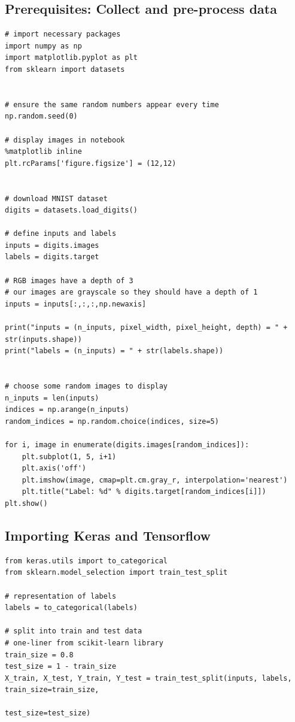 \documentclass[%
oneside,                 %
final,                   %
10pt]{article}
\begin{document}
\subsection*{Prerequisites: Collect and pre-process data}
\begin{verbatim}
# import necessary packages
import numpy as np
import matplotlib.pyplot as plt
from sklearn import datasets


# ensure the same random numbers appear every time
np.random.seed(0)

# display images in notebook
%matplotlib inline
plt.rcParams['figure.figsize'] = (12,12)


# download MNIST dataset
digits = datasets.load_digits()

# define inputs and labels
inputs = digits.images
labels = digits.target

# RGB images have a depth of 3
# our images are grayscale so they should have a depth of 1
inputs = inputs[:,:,:,np.newaxis]

print("inputs = (n_inputs, pixel_width, pixel_height, depth) = " + str(inputs.shape))
print("labels = (n_inputs) = " + str(labels.shape))


# choose some random images to display
n_inputs = len(inputs)
indices = np.arange(n_inputs)
random_indices = np.random.choice(indices, size=5)

for i, image in enumerate(digits.images[random_indices]):
    plt.subplot(1, 5, i+1)
    plt.axis('off')
    plt.imshow(image, cmap=plt.cm.gray_r, interpolation='nearest')
    plt.title("Label: %d" % digits.target[random_indices[i]])
plt.show()
\end{verbatim}


\subsection*{Importing Keras and Tensorflow}
\begin{verbatim}
from keras.utils import to_categorical
from sklearn.model_selection import train_test_split

# representation of labels
labels = to_categorical(labels)

# split into train and test data
# one-liner from scikit-learn library
train_size = 0.8
test_size = 1 - train_size
X_train, X_test, Y_train, Y_test = train_test_split(inputs, labels, train_size=train_size,
                                                    test_size=test_size)
\end{verbatim}
\end{document}
